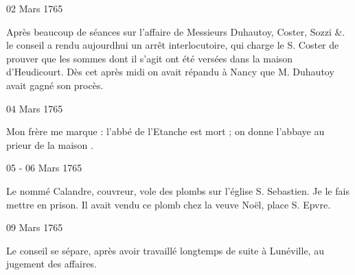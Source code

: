                      \begin{diary}{02 Mars 1765}{}

                         Après beaucoup de séances sur
                           l'affaire
                           de Messieurs
                           Duhautoy, Coster, Sozzi \&. le conseil
                           a rendu aujourdhui un arrêt
                           interlocutoire,
                           qui charge le S. Coster de
                           prouver que les sommes
                           dont il s'agit ont été versées dans la maison
                              d'Heudicourt. Dès cet après midi on avait
                           répandu à Nancy que M. Duhautoy avait
                           gagné son procès. \bigskip


                     \end{diary}

                     \begin{diary}{04 Mars 1765}{}


                           Mon frère me marque : \og l'abbé de l'Etanche
                              est mort ; on donne l'abbaye au prieur de la maison \fg{}. \bigskip


                     \end{diary}

                     \begin{diary}{05 - 06 Mars 1765}{}


                           Le nommé Calandre, couvreur, vole
                           des
                           plombs sur l’église S.
                              Sebastien. Je le fais
                           mettre en prison. Il avait vendu ce plomb
                           chez
                           la veuve Noël, place
                              S. Epvre. \bigskip


                     \end{diary}

                     \begin{diary}{09 Mars 1765}{}


                           Le conseil se sépare, après avoir
                           travaillé
                           longtemps de suite à Lunéville, au jugement
                           des affaires. \bigskip


                     \end{diary}


